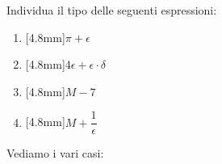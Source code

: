 \newpage %

\begin{esempio}
 Individua il tipo delle seguenti espressioni:

\begin{multicols}{4}
\begin{enumerate} [nosep]
 \item \raisebox{+0mm}[4.8mm]{}\(\pi+\epsilon\)
 \item \raisebox{+0mm}[4.8mm]{}\(4\epsilon+\epsilon \cdot \delta\)
 \item \raisebox{+0mm}[4.8mm]{}\(M-7\)
 \item \raisebox{+0mm}[4.8mm]{}\(M+\dfrac{1}{\epsilon}\)
\end{enumerate}
\end{multicols}

Vediamo i vari casi:


\end{esempio}
